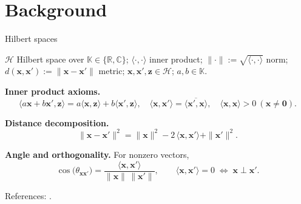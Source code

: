 \documentclass[aspectratio=169]{beamer}
\let\oldcite\cite %
\renewcommand{\cite}[1]{{\tiny\oldcite{#1}}}
\begin{document}
\section{Background}
\begin{frame}{Hilbert spaces}

$\mathcal{H}$ Hilbert space over $\mathbb{K}\in\{\mathbb{R},\mathbb{C}\}$;
$\langle \cdot,\cdot\rangle$ inner product; $\|\cdot\|:=\sqrt{\langle\cdot,\cdot\rangle}$ norm;
$d(\mathbf{x},\mathbf{x}'):=\|\mathbf{x}-\mathbf{x}'\|$ metric;
$\mathbf{x},\mathbf{x}',\mathbf{z}\in\mathcal{H}$; $a,b\in\mathbb{K}$.

\medskip
\textbf{Inner product axioms.}
\[
\langle a\mathbf{x}+b\mathbf{x}',\mathbf{z}\rangle
= a\langle \mathbf{x},\mathbf{z}\rangle + b\langle \mathbf{x}',\mathbf{z}\rangle,\quad
\langle \mathbf{x},\mathbf{x}'\rangle=\overline{\langle \mathbf{x}',\mathbf{x}\rangle},\quad
\langle \mathbf{x},\mathbf{x}\rangle>0~(\mathbf{x}\neq \mathbf{0}).
\]

\medskip
\textbf{Distance decomposition.}
\[
\|\mathbf{x}-\mathbf{x}'\|^{2}
=\|\mathbf{x}\|^{2}-2\,\langle \mathbf{x},\mathbf{x}'\rangle+\|\mathbf{x}'\|^{2}.
\]

\medskip
\textbf{Angle and orthogonality.}
For nonzero vectors,
\[
\cos\bigl(\theta_{\mathbf{x}\mathbf{x}'}\bigr)
=\frac{\langle \mathbf{x},\mathbf{x}'\rangle}{\|\mathbf{x}\|\,\|\mathbf{x}'\|},\qquad
\langle \mathbf{x},\mathbf{x}'\rangle=0 \;\Longleftrightarrow\; \mathbf{x}\perp \mathbf{x}'.
\]

\medskip
\footnotesize References: \cite{ryzhov2022modern}.
\end{frame}
\end{document}
